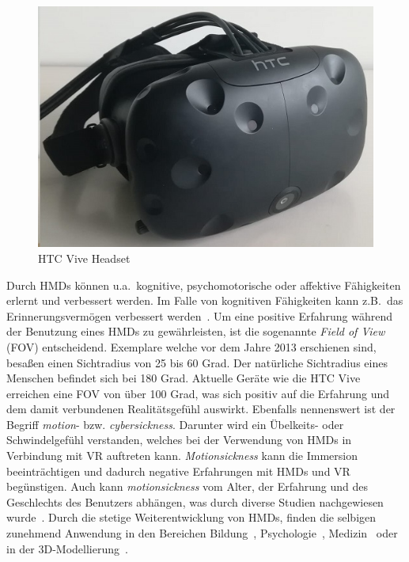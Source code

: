 \begin{figure}[h]
\captionsetup{width=.7\linewidth}
\includegraphics[scale=0.75]{Bilder/Hauptteil/viveheadset}
\centering
\caption{HTC Vive Headset}
\label{fig:hmds}
\end{figure}

\noindent Durch HMDs können u.a.~kognitive, psychomotorische oder affektive Fähigkeiten erlernt und verbessert werden. Im Falle von kognitiven Fähigkeiten kann z.B.~das Erinnerungs\-vermögen verbessert werden~\cite{hmdsineducation}. Um eine positive Erfahrung während der Benutzung eines HMDs zu gewährleisten, ist die sogenannte \textit{Field of View} (FOV) entscheidend. Exemplare welche vor dem Jahre 2013 erschienen sind, besaßen einen Sichtradius von 25 bis 60 Grad. Der natürliche Sichtradius eines Menschen befindet sich bei 180 Grad. Aktuelle Geräte wie die HTC Vive erreichen eine FOV von über 100 Grad, was sich positiv auf die Erfahrung und dem damit verbundenen Realitätsgefühl auswirkt. Ebenfalls nennenswert ist der Begriff \textit{motion}- bzw. \textit{cybersickness}. Darunter wird ein Übelkeits- oder Schwindelgefühl verstanden, welches bei der Verwendung von HMDs in Verbindung mit VR auftreten kann. \textit{Motionsickness} kann die Immersion beeinträchtigen und dadurch negative Erfahrungen mit HMDs und VR begünstigen. Auch kann \textit{motionsickness} vom Alter, der Erfahrung und des Geschlechts des Benutzers abhängen, was durch diverse Studien nachgewiesen wurde~\cite{hmdsineducation}. Durch die stetige Weiterentwicklung von HMDs, finden die selbigen zunehmend Anwendung in den Bereichen Bildung~\cite{hmdsineducation}, Psychologie~\cite{hmdsinpsychology}, Medizin~\cite{hmdsinmedicine} oder in der 3D-Modellierung~\cite{hmdsinmodeling}.

